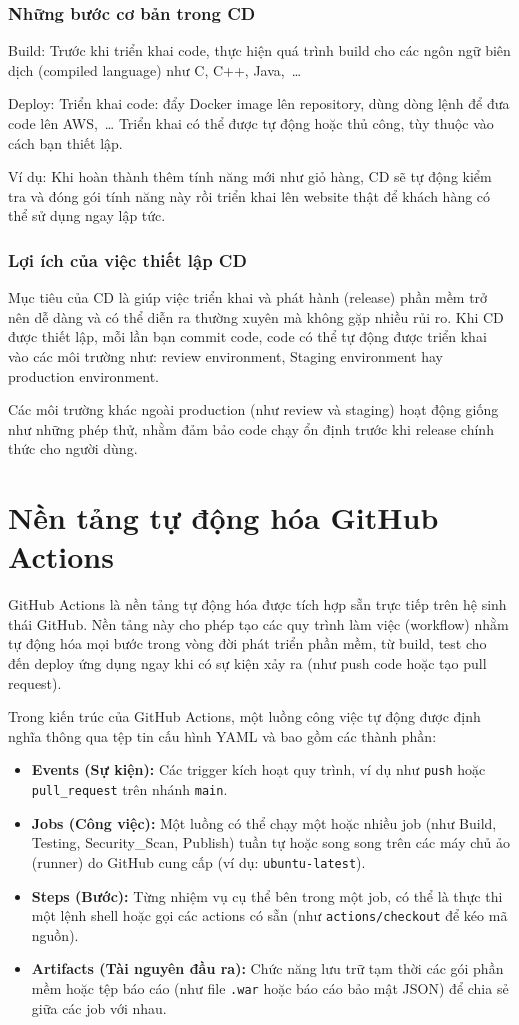 \documentclass[12pt,a4paper,oneside]{extreport}
\begin{document}
\subsubsection{Những bước cơ bản trong CD}
Build: Trước khi triển khai code, thực hiện quá trình build cho các ngôn ngữ
biên dịch (compiled language) như C, C++, Java,~\ldots

Deploy: Triển khai code: đẩy Docker image lên repository, dùng dòng lệnh để đưa
code lên AWS,~\ldots{} Triển khai có thể được tự động hoặc thủ công, tùy thuộc
vào cách bạn thiết lập.

Ví dụ: Khi hoàn thành thêm tính năng mới như giỏ hàng, CD sẽ tự động kiểm tra
và đóng gói tính năng này rồi triển khai lên website thật để khách hàng có thể
sử dụng ngay lập tức.

\subsubsection{Lợi ích của việc thiết lập CD}
Mục tiêu của CD là giúp việc triển khai và phát hành (release) phần mềm trở nên
dễ dàng và có thể diễn ra thường xuyên mà không gặp nhiều rủi ro. Khi CD được
thiết lập, mỗi lần bạn commit code, code có thể tự động được triển khai vào các
môi trường như: review environment, Staging environment hay production
environment.

Các môi trường khác ngoài production (như review và staging) hoạt động giống
như những phép thử, nhằm đảm bảo code chạy ổn định trước khi release chính thức
cho người dùng.

\section{Nền tảng tự động hóa GitHub Actions}
GitHub Actions là nền tảng tự động hóa được tích hợp sẵn trực tiếp trên hệ sinh
thái GitHub. Nền tảng này cho phép tạo các quy trình làm việc (workflow) nhằm
tự động hóa mọi bước trong vòng đời phát triển phần mềm, từ build, test cho đến
deploy ứng dụng ngay khi có sự kiện xảy ra (như push code hoặc tạo pull
request).

Trong kiến trúc của GitHub Actions, một luồng công việc tự động được định nghĩa
thông qua tệp tin cấu hình YAML và bao gồm các thành phần:
\begin{itemize}
  \item \textbf{Events (Sự kiện):} Các trigger kích hoạt quy trình, ví dụ như
  \texttt{push} hoặc \texttt{pull\_request} trên nhánh \texttt{main}.
  \item \textbf{Jobs (Công việc):} Một luồng có thể chạy một hoặc nhiều job (như
  Build, Testing, Security\_Scan, Publish) tuần tự hoặc song song trên các máy
  chủ ảo (runner) do GitHub cung cấp (ví dụ: \texttt{ubuntu-latest}).
  \item \textbf{Steps (Bước):} Từng nhiệm vụ cụ thể bên trong một job, có thể là
  thực thi một lệnh shell hoặc gọi các actions có sẵn (như
  \texttt{actions/checkout} để kéo mã nguồn).
  \item \textbf{Artifacts (Tài nguyên đầu ra):} Chức năng lưu trữ tạm thời các
  gói phần mềm hoặc tệp báo cáo (như file \texttt{.war} hoặc báo cáo bảo mật
  JSON) để chia sẻ giữa các job với nhau.
\end{itemize}
\end{document}
